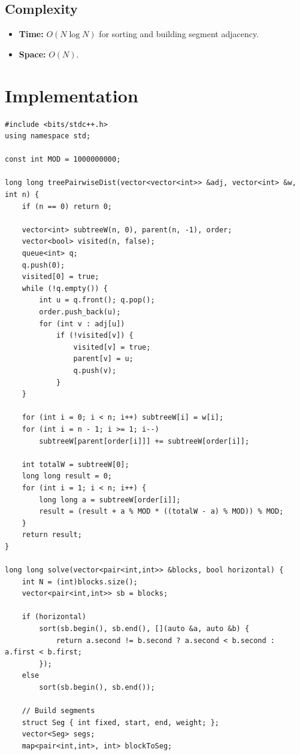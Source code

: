 \documentclass[11pt,a4paper]{article}
\begin{document}
\subsection{Complexity}
\begin{itemize}
    \item \textbf{Time:} $O(N \log N)$ for sorting and building segment adjacency.
    \item \textbf{Space:} $O(N)$.
\end{itemize}

\section{Implementation}

\begin{lstlisting}
#include <bits/stdc++.h>
using namespace std;

const int MOD = 1000000000;

long long treePairwiseDist(vector<vector<int>> &adj, vector<int> &w, int n) {
    if (n == 0) return 0;

    vector<int> subtreeW(n, 0), parent(n, -1), order;
    vector<bool> visited(n, false);
    queue<int> q;
    q.push(0);
    visited[0] = true;
    while (!q.empty()) {
        int u = q.front(); q.pop();
        order.push_back(u);
        for (int v : adj[u])
            if (!visited[v]) {
                visited[v] = true;
                parent[v] = u;
                q.push(v);
            }
    }

    for (int i = 0; i < n; i++) subtreeW[i] = w[i];
    for (int i = n - 1; i >= 1; i--)
        subtreeW[parent[order[i]]] += subtreeW[order[i]];

    int totalW = subtreeW[0];
    long long result = 0;
    for (int i = 1; i < n; i++) {
        long long a = subtreeW[order[i]];
        result = (result + a % MOD * ((totalW - a) % MOD)) % MOD;
    }
    return result;
}

long long solve(vector<pair<int,int>> &blocks, bool horizontal) {
    int N = (int)blocks.size();
    vector<pair<int,int>> sb = blocks;

    if (horizontal)
        sort(sb.begin(), sb.end(), [](auto &a, auto &b) {
            return a.second != b.second ? a.second < b.second : a.first < b.first;
        });
    else
        sort(sb.begin(), sb.end());

    // Build segments
    struct Seg { int fixed, start, end, weight; };
    vector<Seg> segs;
    map<pair<int,int>, int> blockToSeg;


\end{lstlisting}
\end{document}
